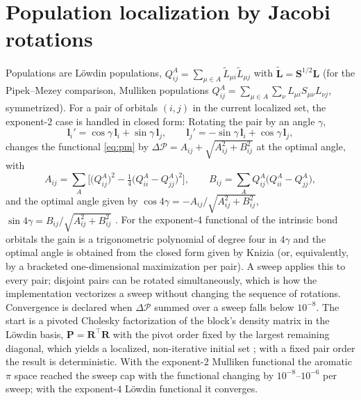 \documentclass[11pt,a4paper]{article}
\newcommand{\vb}[1]{\bm{#1}}
\begin{document}
\section{Population localization by Jacobi rotations}
\label{app:pm}
Populations are L\"owdin populations, $Q^A_{ij}=\sum_{\mu\in A}\tilde L_{\mu i}\tilde L_{\mu j}$ with $\tilde{\vb L}=\vb{S}^{1/2}\vb{L}$ (for the Pipek--Mezey comparison, Mulliken populations $Q^A_{ij}=\sum_{\mu\in A}\sum_\nu L_{\mu i}S_{\mu\nu}L_{\nu j}$, symmetrized). For a pair of orbitals $(i,j)$ in the current localized set, the exponent-2 case is handled in closed form: Rotating the pair by an angle $\gamma$,
\[
\vb{l}_i'=\cos\gamma\,\vb{l}_i+\sin\gamma\,\vb{l}_j,\qquad \vb{l}_j'=-\sin\gamma\,\vb{l}_i+\cos\gamma\,\vb{l}_j ,
\]
changes the functional \eqref{eq:pm} by $\Delta\mathcal{P}=A_{ij}+\sqrt{A_{ij}^2+B_{ij}^2}$ at the optimal angle, with
\begin{equation}
A_{ij}=\sum_A\Big[\big(Q^A_{ij}\big)^2-\tfrac14\big(Q^A_{ii}-Q^A_{jj}\big)^2\Big],\qquad
B_{ij}=\sum_A Q^A_{ij}\big(Q^A_{ii}-Q^A_{jj}\big),
\end{equation}
and the optimal angle given by $\cos4\gamma=-A_{ij}/\sqrt{A_{ij}^2+B_{ij}^2}$, $\sin4\gamma=B_{ij}/\sqrt{A_{ij}^2+B_{ij}^2}$ \cite{pm}. For the exponent-4 functional of the intrinsic bond orbitals the gain is a trigonometric polynomial of degree four in $4\gamma$ and the optimal angle is obtained from the closed form given by Knizia \cite{ibo} (or, equivalently, by a bracketed one-dimensional maximization per pair). A sweep applies this to every pair; disjoint pairs can be rotated simultaneously, which is how the implementation vectorizes a sweep without changing the sequence of rotations. Convergence is declared when $\Delta\mathcal{P}$ summed over a sweep falls below $10^{-8}$. The start is a pivoted Cholesky factorization of the block's density matrix in the L\"owdin basis, $\vb{P}=\vb{R}^{\!\top}\vb{R}$ with the pivot order fixed by the largest remaining diagonal, which yields a localized, non-iterative initial set \cite{cholesky}; with a fixed pair order the result is deterministic. With the exponent-2 Mulliken functional the aromatic $\pi$ space reached the sweep cap with the functional changing by $10^{-8}$--$10^{-6}$ per sweep; with the exponent-4 L\"owdin functional it converges.
\end{document}
